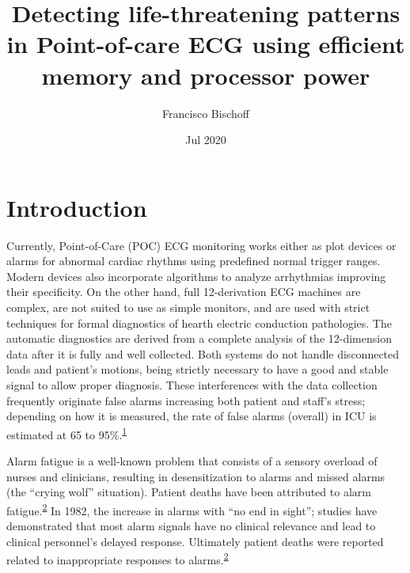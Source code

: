 \documentclass[12pt,twoside]{fmupthesis}
\title{Detecting life-threatening patterns in Point-of-care ECG using efficient memory and processor power}
\author{Francisco Bischoff}
\date{Jul 2020}
\begin{document}
\maketitle

\frontmatter %
\pagestyle{empty} %



\hypersetup{linkcolor=black}
\setcounter{secnumdepth}{2}
\setcounter{tocdepth}{2}
\tableofcontents

\listoftables

\listoffigures



\mainmatter %
\pagestyle{fancyplain} %

\hypertarget{introduction}{%
\chapter*{Introduction}\label{introduction}}

Currently, Point-of-Care (POC) ECG monitoring works either as plot devices or alarms for abnormal
cardiac rhythms using predefined normal trigger ranges. Modern devices also incorporate algorithms
to analyze arrhythmias improving their specificity. On the other hand, full 12-derivation ECG
machines are complex, are not suited to use as simple monitors, and are used with strict techniques
for formal diagnostics of hearth electric conduction pathologies. The automatic diagnostics are
derived from a complete analysis of the 12-dimension data after it is fully and well collected. Both
systems do not handle disconnected leads and patient's motions, being strictly necessary to have a
good and stable signal to allow proper diagnosis. These interferences with the data collection
frequently originate false alarms increasing both patient and staff's stress; depending on how it is
measured, the rate of false alarms (overall) in ICU is estimated at 65 to 95\%.\textsuperscript{\protect\hyperlink{ref-donchin2002}{1}}

Alarm fatigue is a well-known problem that consists of a sensory overload of nurses and clinicians,
resulting in desensitization to alarms and missed alarms (the ``crying wolf'' situation). Patient
deaths have been attributed to alarm fatigue.\textsuperscript{\protect\hyperlink{ref-sendelbach2013}{2}} In 1982, the increase in alarms with
``no end in sight''; studies have demonstrated that most alarm signals have no clinical relevance and
lead to clinical personnel's delayed response. Ultimately patient deaths were reported related to
inappropriate responses to alarms.\textsuperscript{\protect\hyperlink{ref-sendelbach2013}{2}}
\end{document}
